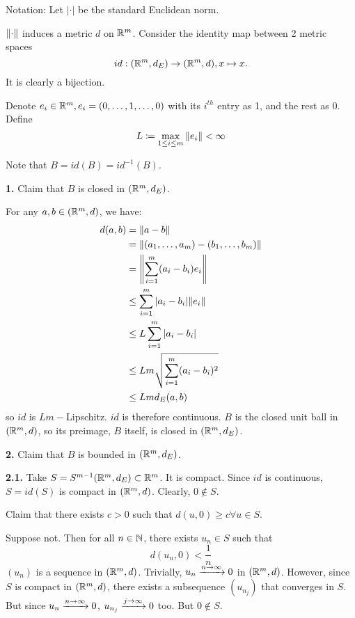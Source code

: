 \documentclass[a4paper, 12pt]{article}
\begin{document}
\begin{solution}
    Notation: Let $|\cdot|$ be the standard Euclidean norm.

    $\norm{\cdot}$ induces a metric $d$ on $\bbr^m$. Consider the identity map between 2 metric spaces \[
        id: (\bbr^m, d_E) \to (\bbr^m, d), x \mapsto x.
    \]
    It is clearly a bijection.

    Denote $e_i \in \bbr^m, e_i = (0, \dots, 1, \dots, 0)$ with its $i^{th}$ entry as 1, and the rest as 0. Define \[
        L \coloneqq \max_{1 \leq i \leq m}{\norm{e_i}} < \infty
    \]

    Note that $B = id(B) = id^{-1}(B)$.

    \textbf{1.} Claim that $B$ is closed in $(\bbr^m, d_E)$.

    For any $a, b \in (\bbr^m, d)$, we have:
    \begin{align*}
        d(a, b) & = \norm{a - b}                                 \\
                & = \norm{(a_1, \dots, a_m) - (b_1, \dots, b_m)} \\
                & = \norm*{\sum_{i=1}^m (a_i-b_i) e_i}           \\
                & \leq \sum_{i=1}^m |a_i-b_i|\norm{e_i}          \\
                & \leq L\sum_{i=1}^m |a_i-b_i|                   \\
                & \leq Lm \sqrt{\sum_{i=1}^m (a_i-b_i)^2}        \\
                & \leq Lm d_E(a, b)
    \end{align*}
    so $id$ is $Lm-$Lipschitz. $id$ is therefore continuous. $B$ is the closed unit ball in $(\bbr^m, d)$, so its preimage, $B$ itself, is closed in $(\bbr^m, d_E)$.

    \textbf{2.} Claim that $B$ is bounded in $(\bbr^m, d_E)$.

    \textbf{2.1.}
    Take $S = S^{m-1}(\bbr^m, d_E) \subset \bbr^m$. It is compact. Since $id$ is continuous, $S = id(S)$ is compact in $(\bbr^m, d)$. Clearly, $0 \not \in S$.

    Claim that there exists $c > 0$ such that $d(u, 0) \geq c \forall u \in S$.

    Suppose not. Then for all $n \in \bbn$, there exists $u_n \in S$ such that \[
        d(u_n, 0) < \frac{1}{n}
    \]
    $(u_n)$ is a sequence in $(\bbr^m, d)$. Trivially, $u_n \cvgn 0$ in $(\bbr^m, d)$. However, since $S$ is compact in $(\bbr^m, d)$, there exists a subsequence $(u_{n_j})$ that converges in $S$. But since $u_n \cvgn 0$,  $u_{n_j} \cvgj 0$ too. But $0 \not \in S$. \contra


\end{solution}
\end{document}
